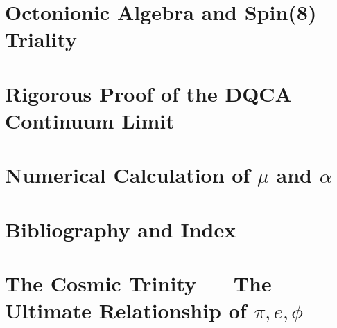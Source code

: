 \documentclass[11pt,a4paper,twoside]{book}
\begin{document}
\appendix

\chapter{Octonionic Algebra and Spin(8) Triality}


\chapter{Rigorous Proof of the DQCA Continuum Limit}


\chapter{Numerical Calculation of \texorpdfstring{$\mu$ and $\alpha$}{mu and alpha}}


\chapter{Bibliography and Index}


\chapter{The Cosmic Trinity --- The Ultimate Relationship of \texorpdfstring{$\pi, e, \phi$}{pi, e, phi}}


\backmatter


\end{document}
